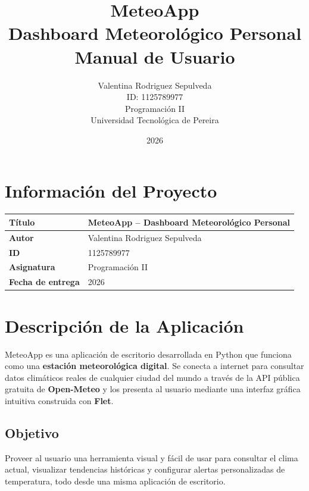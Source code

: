 \documentclass[12pt,a4paper]{article}
\title{\Huge \textbf{MeteoApp}\\[0.3cm]
       \Large Dashboard Meteorológico Personal\\[0.3cm]
       \large Manual de Usuario}
\author{Valentina Rodriguez Sepulveda\\[0.2cm]
        \small ID: 1125789977\\[0.2cm]
        \small Programación II\\[0.2cm]
        \small Universidad Tecnológica de Pereira}
\date{2026}
\begin{document}
\maketitle
\thispagestyle{empty}
\newpage
\tableofcontents
\newpage
\section{Información del Proyecto}
\begin{tabular}{|l|l|}
\hline
\textbf{Título} & MeteoApp -- Dashboard Meteorológico Personal \\
\hline
\textbf{Autor} & Valentina Rodriguez Sepulveda \\
\hline
\textbf{ID} & 1125789977 \\
\hline
\textbf{Asignatura} & Programación II\\
\hline
\textbf{Fecha de entrega} & 2026 \\
\hline
\end{tabular}
\section{Descripción de la Aplicación}
MeteoApp es una aplicación de escritorio desarrollada en Python que funciona como una \textbf{estación meteorológica digital}. Se conecta a internet para consultar datos climáticos reales de cualquier ciudad del mundo a través de la API pública gratuita de \textbf{Open-Meteo} y los presenta al usuario mediante una interfaz gráfica intuitiva construida con \textbf{Flet}.
\subsection{Objetivo}
Proveer al usuario una herramienta visual y fácil de usar para consultar el clima actual, visualizar tendencias históricas y configurar alertas personalizadas de temperatura, todo desde una misma aplicación de escritorio.
\end{document}
